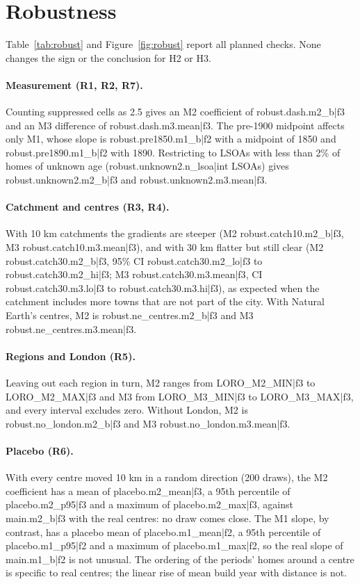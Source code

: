 \section{Robustness}
\label{sec:robust}
Table~\ref{tab:robust} and Figure~\ref{fig:robust} report all planned checks. None changes the sign or the conclusion for H2 or H3.

\paragraph{Measurement (R1, R2, R7).} Counting suppressed cells as 2.5 gives an M2 coefficient of {{robust.dash.m2_b|f3}} and an M3 difference of {{robust.dash.m3.mean|f3}}. The pre-1900 midpoint affects only M1, whose slope is {{robust.pre1850.m1_b|f2}} with a midpoint of 1850 and {{robust.pre1890.m1_b|f2}} with 1890. Restricting to LSOAs with less than 2\% of homes of unknown age ({{robust.unknown2.n_lsoa|int}} LSOAs) gives {{robust.unknown2.m2_b|f3}} and {{robust.unknown2.m3.mean|f3}}.

\paragraph{Catchment and centres (R3, R4).} With 10 km catchments the gradients are steeper (M2 {{robust.catch10.m2_b|f3}}, M3 {{robust.catch10.m3.mean|f3}}), and with 30 km flatter but still clear (M2 {{robust.catch30.m2_b|f3}}, 95\% CI {{robust.catch30.m2_lo|f3}} to {{robust.catch30.m2_hi|f3}}; M3 {{robust.catch30.m3.mean|f3}}, CI {{robust.catch30.m3.lo|f3}} to {{robust.catch30.m3.hi|f3}}), as expected when the catchment includes more towns that are not part of the city. With Natural Earth's centres, M2 is {{robust.ne_centres.m2_b|f3}} and M3 {{robust.ne_centres.m3.mean|f3}}.

\paragraph{Regions and London (R5).} Leaving out each region in turn, M2 ranges from {{LORO_M2_MIN|f3}} to {{LORO_M2_MAX|f3}} and M3 from {{LORO_M3_MIN|f3}} to {{LORO_M3_MAX|f3}}, and every interval excludes zero. Without London, M2 is {{robust.no_london.m2_b|f3}} and M3 {{robust.no_london.m3.mean|f3}}.

\paragraph{Placebo (R6).} With every centre moved 10 km in a random direction (200 draws), the M2 coefficient has a mean of {{placebo.m2_mean|f3}}, a 95th percentile of {{placebo.m2_p95|f3}} and a maximum of {{placebo.m2_max|f3}}, against {{main.m2_b|f3}} with the real centres: no draw comes close. The M1 slope, by contrast, has a placebo mean of {{placebo.m1_mean|f2}}, a 95th percentile of {{placebo.m1_p95|f2}} and a maximum of {{placebo.m1_max|f2}}, so the real slope of {{main.m1_b|f2}} is not unusual. The ordering of the periods' homes around a centre is specific to real centres; the linear rise of mean build year with distance is not.

